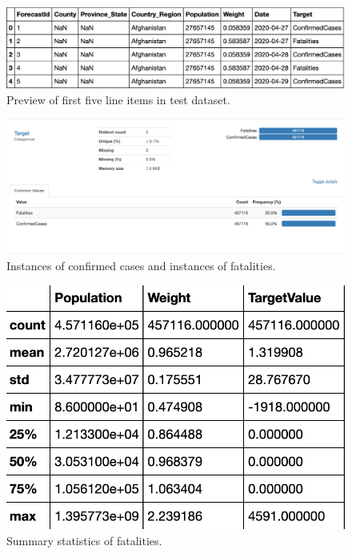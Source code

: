 \documentclass{article}
\begin{document}
\begin{figure}
  \centering
  \includegraphics[width=\columnwidth]{test_head.png}
  \caption{Preview of first five line items in test dataset.}
\end{figure}
\begin{figure}
  \centering
  \includegraphics[width=\columnwidth]{target_values.png}
  \caption{Instances of confirmed cases and instances of fatalities.}
\end{figure}
\begin{figure}
  \centering
  \includegraphics[width=\columnwidth]{fatalities.png}
  \caption{Summary statistics of fatalities.}
\end{figure}
\end{document}
